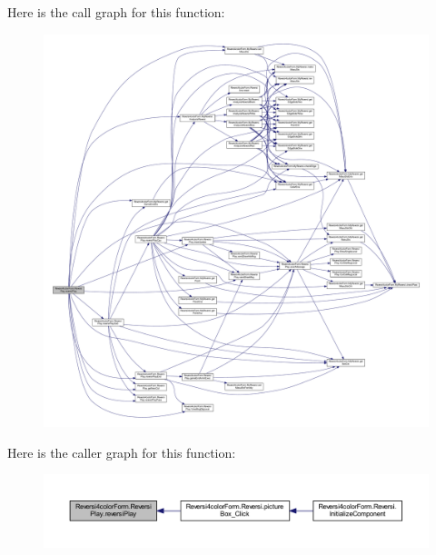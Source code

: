 Here is the call graph for this function\+:
\nopagebreak
\begin{figure}[H]
\begin{center}
\leavevmode
\includegraphics[width=350pt]{class_reversi4color_form_1_1_reversi_play_a88c4cd228512f02a940fbe147c9d75c3_cgraph}
\end{center}
\end{figure}
Here is the caller graph for this function\+:
\nopagebreak
\begin{figure}[H]
\begin{center}
\leavevmode
\includegraphics[width=350pt]{class_reversi4color_form_1_1_reversi_play_a88c4cd228512f02a940fbe147c9d75c3_icgraph}
\end{center}
\end{figure}
\mbox{\label{class_reversi4color_form_1_1_reversi_play_a0fdeec03a631927d44ed2602808b8619}} 
